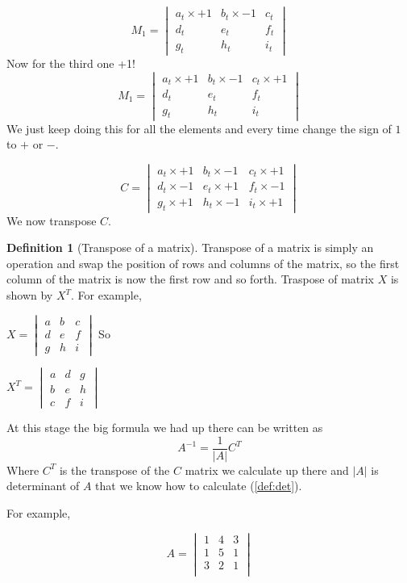 \documentclass[
]{book}
\theoremstyle{definition}
\newtheorem{definition}{Definition}[chapter]
\theoremstyle{definition}
\theoremstyle{definition}
\theoremstyle{remark}
\begin{document}
\[M_1=\begin{vmatrix} a_t \times +1 & b_t \times -1 &c_t \\ d_t & e_t & f_t\\g_t & h_t &i_t \end{vmatrix}\]
Now for the third one +1!
\[M_1=\begin{vmatrix} a_t \times +1 & b_t \times -1 &c_t \times +1 \\ d_t & e_t & f_t\\g_t & h_t &i_t \end{vmatrix}\]
We just keep doing this for all the elements and every time change the sign of \(1\) to \(+\) or \(-\).

\[C=\begin{vmatrix} a_t \times +1 & b_t \times -1 &c_t \times +1 \\ d_t \times -1 & e_t \times +1 & f_t \times -1\\g_t \times +1 & h_t \times -1 &i_t\times +1 \end{vmatrix}\]
We now transpose \(C\).

\begin{definition}[Transpose of a matrix]
\protect\hypertarget{def:transpose}{}{\label{def:transpose} \iffalse (Transpose of a matrix) \fi{} }Transpose of a matrix is simply an operation and swap the position of rows and columns of the matrix, so the first column of the matrix is now the first row and so forth. Traspose of matrix \(X\) is shown by \(X^T\). For example,

\(X=\begin{vmatrix} a & b &c \\ d & e & f\\g & h &i \end{vmatrix}\)
So

\(X^{T}=\begin{vmatrix} a & d &g \\ b & e & h\\c & f &i \end{vmatrix}\)
\end{definition}

At this stage the big formula we had up there can be written as
\[A^{-1}=\frac{1}{|A|}C^T\]
Where \(C^T\) is the transpose of the \(C\) matrix we calculate up there and \(|A|\) is determinant of \(A\) that we know how to calculate (\ref{def:det}).

For example,

\[A=\begin{vmatrix}
1 & 4 & 3\\
1 & 5 & 1\\
3 & 2 & 1\\
\end{vmatrix}\]
\end{document}
